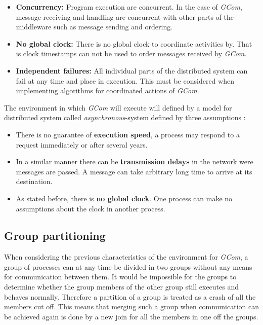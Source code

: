 \documentclass[titlepage, twocolumn, a4paper, 10pt]{article}
\begin{document}
\begin{itemize}
\item \textbf{Concurrency: } Program execution are concurrent. In the
  case of \textit{GCom}, message receiving and handling are concurrent
  with other parts of the middleware such as message sending and ordering.
\item \textbf{No global clock: } There is no global clock to
  coordinate activities by. That is clock timestamps can not be used
  to order messages received by \textit{GCom}.
\item \textbf{Independent failures: } All individual parts of the
  distributed system can fail at any time and place in execution. This
  must be considered when implementing algorithms for coordinated
  actions of \textit{GCom}.
\end{itemize}

The environment in which \textit{GCom} will execute will defined by
a model for distributed system called \textit{asynchronous}-system
defined by three assumptions \cite{book:dist-syst}:

\begin{itemize}
\item There is no guarantee of \textbf{execution speed}, a process may respond
  to a request immediately or after several years.
\item In a similar manner there can be \textbf{transmission delays} in the
  network were messages are passed. A message can take arbitrary long
  time to arrive at its destination.
\item As stated before, there is \textbf{no global clock}. One process can make
  no assumptions about the clock in another process.
\end{itemize}

\subsection{Group partitioning}\label{sec:group-partitioning}
When considering the previous characteristics of the environment for
\textit{GCom}, a group of processes can at any time be divided in two
groups without any means for communication between them. It would be
impossible for the groups to determine whether the group members of
the other group still executes and behaves normally. Therefore a
partition of a group is treated as a crash of all the members cut off.
This means that merging such a group when communication can be
achieved again is done by a new join for all the members in one off
the groups.
\end{document}
